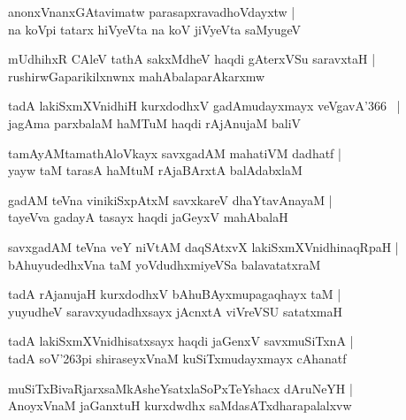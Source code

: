 \documentclass[twoside,12pt,openright]{book}
\def\S{\char'263}
\newcounter{shloka}[chapter]
\begin{document}
\begin{shloka}%
anonxVnanxGAtavimatw parasapxravadhoVdayxtw |\\
na koVpi tatarx hiVyeVta na koV jiVyeVta saMyugeV 
\end{shloka}

\begin{shloka}%
mUdhihxR CAleV tathA sakxMdheV haqdi gAterxVSu saravxtaH |\\
rushirwGaparikilxnwnx mahAbalaparAkarxmw
\end{shloka}

\begin{shloka}%
tadA lakiSxmXVnidhiH kurxdodhxV gadAmudayxmayx veVgavA\char'366 ~|\\
jagAma parxbalaM haMTuM haqdi rAjAnujaM baliV 
\end{shloka}

\begin{shloka}%
tamAyAMtamathAloVkayx savxgadAM mahatiVM dadhatf |\\
yayw taM tarasA haMtuM rAjaBArxtA balAdabxlaM 
\end{shloka}

\begin{shloka}%
gadAM teVna vinikiSxpAtxM savxkareV dhaYtavAnayaM |\\
tayeVva gadayA tasayx haqdi jaGeyxV mahAbalaH 
\end{shloka}

\begin{shloka}%
savxgadAM teVna veY niVtAM daqSAtxvX lakiSxmXVnidhinaqRpaH |\\
bAhuyudedhxVna taM yoVdudhxmiyeVSa balavatatxraM 
\end{shloka}

\begin{shloka}%
tadA rAjanujaH kurxdodhxV bAhuBAyxmupagaqhayx taM |\\
yuyudheV saravxyudadhxsayx jAcnxtA viVreVSU satatxmaH 
\end{shloka}

\begin{shloka}%
tadA lakiSxmXVnidhisatxsayx haqdi jaGenxV savxmuSiTxnA |\\
tadA soV\S pi shiraseyxVnaM kuSiTxmudayxmayx cAhanatf 
\end{shloka}

\begin{shloka}%
muSiTxBivaRjarxsaMkAsheYsatxlaSoPxTeYshacx dAruNeYH |\\
AnoyxVnaM jaGanxtuH kurxdwdhx saMdasATxdharapalalxvw
\end{shloka}
\end{document}
